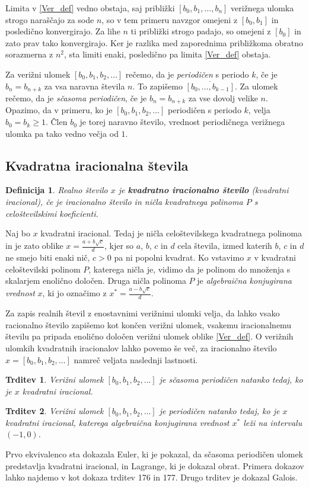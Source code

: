\documentclass[a4paper,12pt]{article}
\newtheorem{trditev}{Trditev}
\newtheorem{definicija}{Definicija}
\begin{document}
Limita v \eqref{Ver_def} vedno obstaja, saj približki $[b_0, b_1, \ldots, b_n]$ verižnega ulomka strogo naraščajo za sode $n$, so v tem primeru navzgor omejeni z $[b_0, b_1]$ in posledično konvergirajo. Za lihe $n$ ti približki strogo padajo, so omejeni z $[b_0]$ in zato prav tako konvergirajo. Ker je razlika med zaporednima približkoma obratno sorazmerna z $n^2$, sta limiti enaki, posledično pa limita \eqref{Ver_def} obstaja. 

Za verižni ulomek $[b_0, b_1, b_2, \ldots]$ rečemo, da je \emph{periodičen} s periodo $k$, če je $b_n = b_{n+k}$ za vsa naravna števila $n$. To zapišemo $\overline{[b_0, \ldots, b_{k-1}]}$.
Za ulomek rečemo, da je \emph{sčasoma periodičen}, če je $b_n = b_{n+k}$ za vse dovolj velike $n$. Opazimo, da v primeru, ko je $[b_0, b_1, b_2, \ldots]$ periodičen s periodo $k$, velja $b_0 = b_k \geq 1$. Člen $b_0$ je torej naravno število, vrednost periodičnega verižnega ulomka pa tako vedno večja od $1$. 


\subsection{Kvadratna iracionalna števila}

\begin{definicija}
	Realno število $x$ je \textbf{kvadratno iracionalno število} (kvadratni iracional), če je iracionalno število in ničla kvadratnega polinoma $P$ s celoštevilskimi koeficienti.
\end{definicija}
Naj bo $x$ kvadratni iracional. Tedaj je ničla celoštevilskega kvadratnega polinoma in je zato oblike $x = \frac{a + b\sqrt{c}}{d}$, kjer so $a$, $b$, $c$ in $d$ cela števila, izmed katerih $b$, $c$ in $d$ ne smejo biti enaki nič, $c > 0$ pa ni popolni kvadrat. Ko vstavimo $x$ v kvadratni celoštevilski polinom $P$, katerega ničla je, vidimo da je polinom do množenja s skalarjem enolično določen.
Druga ničla polinoma $P$ je \emph{algebraična konjugirana vrednost} $x$, ki jo označimo z $x^* = \frac{a - b\sqrt{c}}{d}$.

Za zapis realnih števil z enostavnimi verižnimi ulomki velja, da lahko vsako racionalno število zapišemo kot končen verižni ulomek, vsakemu iracionalnemu številu pa pripada enolično določen verižni ulomek oblike \eqref{Ver_def}. O verižnih ulomkih kvadratnih iracionalov lahko povemo še več, za iracionalno število $x = [b_0, b_1, b_2, \ldots]$ namreč veljata naslednji lastnosti.
\begin{trditev}
    Verižni ulomek $[b_0, b_1, b_2, \ldots]$ je sčasoma periodičen natanko tedaj, ko je $x$ kvadratni iracional.
\end{trditev}
\begin{trditev}
    Verižni ulomek $[b_0, b_1, b_2, \ldots]$ je periodičen natanko tedaj, ko je $x$ kvadratni iracional, katerega algebraična konjugirana vrednost $x^*$ leži na intervalu $(-1, 0)$.
\end{trditev} 
Prvo ekvivalenco sta dokazala Euler, ki je pokazal, da sčasoma periodičen ulomek predstavlja kvadratni iracional, in Lagrange, ki je dokazal obrat. Primera dokazov lahko najdemo v \cite{Hardy} kot dokaza trditev 176 in 177. Drugo trditev je dokazal Galois.
\end{document}
